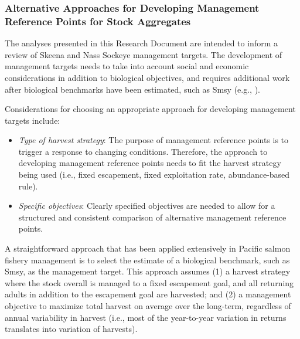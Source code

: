 \documentclass[french,11pt]{book}
\begin{document}
\subsubsection{Alternative Approaches for Developing Management Reference Points for Stock Aggregates}\label{AltApproachesOverview}

The analyses presented in this Research Document are intended to inform a review of Skeena and Nass Sockeye management targets. The development of management targets needs to take into account social and economic considerations in addition to biological objectives, and requires additional work after biological benchmarks have been estimated, such as Smsy (e.g., ).

Considerations for choosing an appropriate approach for developing management targets include:
\begin{itemize}

\item
  \emph{Type of harvest strategy}: The purpose of management reference points is to trigger a response to changing conditions. Therefore, the approach to developing management reference points needs to fit the harvest strategy being used (i.e., fixed escapement, fixed exploitation rate, abundance-based rule).
\item
  \emph{Specific objectives}: Clearly specified objectives are needed to allow for a structured and consistent comparison of alternative management reference points.
\end{itemize}
A straightforward approach that has been applied extensively in Pacific salmon fishery management is to select the estimate of a biological benchmark, such as Smsy, as the management target. This approach assumes (1) a harvest strategy where the stock overall is managed to a fixed escapement goal, and all returning adults in addition to the escapement goal are harvested; and (2) a management objective to maximize total harvest on average over the long-term, regardless of annual variability in harvest (i.e., most of the year-to-year variation in returns translates into variation of harvests).
\end{document}
